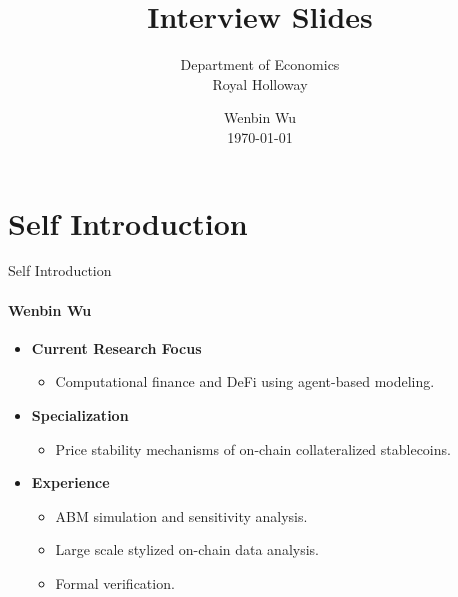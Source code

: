 \documentclass{beamer}
\title{Interview Slides}
\subtitle{Department of Economics\\Royal Holloway\\\vspace{2cm}}
\author{Wenbin Wu\\ \today}
\begin{document}
\shorthandoff{-}
\frame[c]{\maketitle}


\section{Self Introduction}

\begin{frame}{Self Introduction}
\framesubtitle{Wenbin Wu}
    \begin{itemize}
        \item \textbf{Current Research Focus}
        \begin{itemize}
            \item Computational finance and DeFi using agent-based modeling.
        \end{itemize}

        \item \textbf{Specialization}
        \begin{itemize}
            \item Price stability mechanisms of on-chain collateralized stablecoins.
        \end{itemize}

        \item \textbf{Experience}
        \begin{itemize}
            \item ABM simulation and sensitivity analysis. 
            \item Large scale stylized on-chain data analysis.
            \item Formal verification.
        \end{itemize}
    \end{itemize}
\end{frame}
\end{document}

